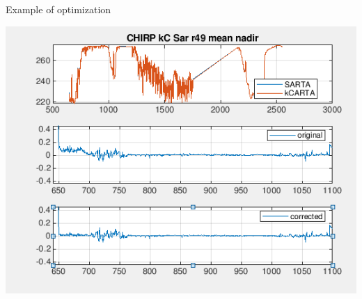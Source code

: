 \documentclass[10pt,t]{beamer}
\begin{document}
\begin{frame}{Example of optimization}

\begin{block}{}
  \begin{center}
    \includegraphics[width=0.6\linewidth]{./Figs/chirp_optimize1.png}
  \end{center}
\end{block}


\end{frame}
\end{document}
